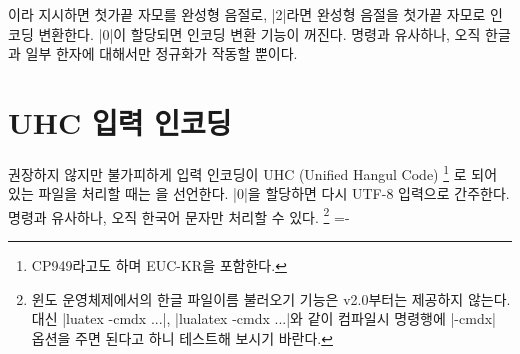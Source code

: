 \documentclass[a4paper]{article}
\def\XeTeX{\hologo{XeTeX}}
\begin{document}
이라 지시하면 첫가끝 자모를 완성형 음절로,
|2|라면 완성형 음절을 첫가끝 자모로 인코딩 변환한다. |0|이 할당되면
인코딩 변환 기능이 꺼진다.   명령과
유사하나, 오직 한글과 일부 한자에 대해서만 정규화가 작동할 뿐이다.

\section{UHC 입력 인코딩}\label{sec:uhcencoding}

권장하지 않지만 불가피하게 입력 인코딩이 UHC (Unified Hangul Code)%
\footnote{%
  CP949라고도 하며 EUC-KR을 포함한다. }%
로 되어 있는 파일을 처리할 때는
을 선언한다.
|0|을 할당하면 다시 UTF-8 입력으로 간주한다.
  명령과 유사하나, 오직 한국어 문자만 처리할 수
있다.%
\footnote{%
  윈도 운영체제에서의 한글 파일이름 불러오기 기능은 v2.0부터는 제공하지 않는다.
  대신 |luatex -cmdx ...|, |lualatex -cmdx ...|와 같이 컴파일시 명령행에
  |-cmdx| 옵션을 주면 된다고 하니 테스트해 보시기 바란다. }
\hfill \fboxsep=-\fboxrule {}
\end{document}
